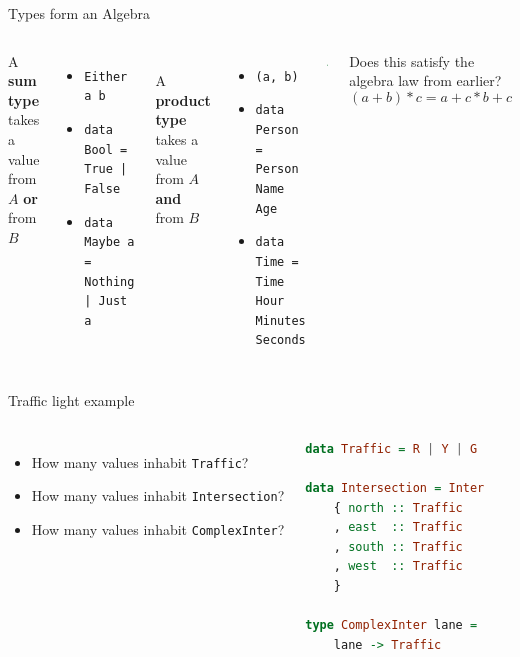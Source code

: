 \documentclass[10pt]{beamer}
\newcommand{\hrsmall}{\noindent\makebox[\linewidth]{\rule{.3\paperwidth}{0.4pt}} \\}
\begin{document}
\begin{frame}[fragile]{Types form an Algebra}
    \begin{columns} %
    A \textbf{sum type} takes a value from $A$ \textbf{or} from $B$
    \begin{itemize}
        \item \texttt{Either a b}
        \item \texttt{data Bool = True | False}
        \item \texttt{data Maybe a \\
    = Nothing | Just a}
    \end{itemize}
    \hrsmall
    A \textbf{product type} takes a value from $A$ \textbf{and} from $B$
    \begin{itemize}
        \item \texttt{(a, b)}
        \item \texttt{data Person = Person Name Age}
        \item \texttt{data Time = Time Hour Minutes Seconds}
    \end{itemize}


    \begin{lstlisting}[language=Haskell]
instance Algebra Type where
  zero = Void
  one  = ()
  (+)  = Either
  (*)  = (,)
    \end{lstlisting}
    
    Does this satisfy the algebra law from earlier? \\
    $$(a+b)*c = a+c * b+c$$

    \end{columns}
\end{frame}


\begin{frame}[fragile]{Traffic light example}
    \begin{columns} %
    \begin{itemize}
        \item How many values inhabit \texttt{Traffic}?
        \item How many values inhabit \texttt{Intersection}?
        \item How many values inhabit \texttt{ComplexInter}?
    \end{itemize}

    \begin{lstlisting}[language=Haskell]
data Traffic = R | Y | G

data Intersection = Inter
    { north :: Traffic
    , east  :: Traffic
    , south :: Traffic
    , west  :: Traffic
    }
        
type ComplexInter lane =
    lane -> Traffic
    \end{lstlisting}
    \end{columns}
\end{frame}
\end{document}
